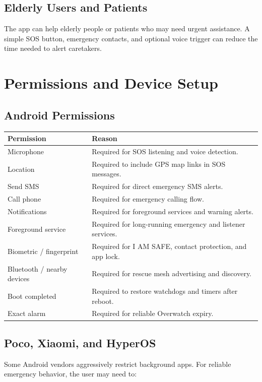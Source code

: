 \documentclass[12pt,a4paper]{report}
\begin{document}
\section{Elderly Users and Patients}

The app can help elderly people or patients who may need urgent assistance. A simple SOS button, emergency contacts, and optional voice trigger can reduce the time needed to alert caretakers.

\chapter{Permissions and Device Setup}

\section{Android Permissions}

\begin{longtable}{p{}p{}}
\toprule
\textbf{Permission} & \textbf{Reason} \\
\midrule
Microphone & Required for SOS listening and voice detection. \\
Location & Required to include GPS map links in SOS messages. \\
Send SMS & Required for direct emergency SMS alerts. \\
Call phone & Required for emergency calling flow. \\
Notifications & Required for foreground services and warning alerts. \\
Foreground service & Required for long-running emergency and listener services. \\
Biometric / fingerprint & Required for I AM SAFE, contact protection, and app lock. \\
Bluetooth / nearby devices & Required for rescue mesh advertising and discovery. \\
Boot completed & Required to restore watchdogs and timers after reboot. \\
Exact alarm & Required for reliable Overwatch expiry. \\
\bottomrule
\end{longtable}

\section{Poco, Xiaomi, and HyperOS}

Some Android vendors aggressively restrict background apps. For reliable emergency behavior, the user may need to:
\end{document}
